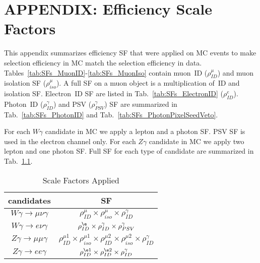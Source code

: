 \chapter{APPENDIX: Efficiency Scale Factors}
\label{sec:SFsTables}

This appendix summarizes efficiency SF that were applied on MC events to make selection efficiency in MC match the selection efficiency in data. Tables~\ref{tab:SFs_MuonID}-\ref{tab:SFs_MuonIso} contain muon~ID ($\rho^{\mu}_{ID}$) and muon isolation SF ($\rho^{\mu}_{iso}$). A full SF on a muon object is a multiplication of~ID and isolation SF. Electron~ID SF are listed in Tab.~\ref{tab:SFs_ElectronID} ($\rho^{e}_{ID}$). Photon~ID ($\rho^{\gamma}_{ID}$) and PSV ($\rho^{\gamma}_{PSV}$) SF are summarized in Tab.~\ref{tab:SFs_PhotonID} and Tab.~\ref{tab:SFs_PhotonPixelSeedVeto}.

For each $W\gamma$ candidate in MC we apply a lepton and a photon SF. PSV SF is used in the electron channel only. For each $Z\gamma$ candidate in MC we apply two lepton and one photon SF. Full SF for each type of candidate are summarized in Tab.~\ref{tab:SFs_Applied}.

\begin{table}[h]
  \footnotesize
  \begin{center}
  \caption{Scale Factors Applied} 
   \begin{tabular}{|c|c|}
 candidates                          & SF\\ \hline
 $W\gamma\rightarrow\mu\nu\gamma$   &   $\rho^{\mu}_{ID} \times \rho^{\mu}_{iso} \times \rho^{\gamma}_{ID}$    \\ \hline
 $W\gamma\rightarrow e\nu\gamma$    &   $\rho^{\e}_{ID} \times \rho^{\gamma}_{ID}\times \rho^{\gamma}_{PSV}$       \\ \hline
 $Z\gamma\rightarrow\mu\mu\gamma$   &   $\rho^{\mu1}_{ID} \times \rho^{\mu1}_{iso} \times \rho^{\mu2}_{ID} \times \rho^{\mu2}_{iso} \times \rho^{\gamma}_{ID}$      \\ \hline
 $Z\gamma\rightarrow ee\gamma$      &   $\rho^{\e1}_{ID} \times \rho^{\e2}_{ID} \times \rho^{\gamma}_{ID}$      \\ \hline
  \end{tabular}
  \label{tab:SFs_Applied}
  \end{center}
\end{table}

